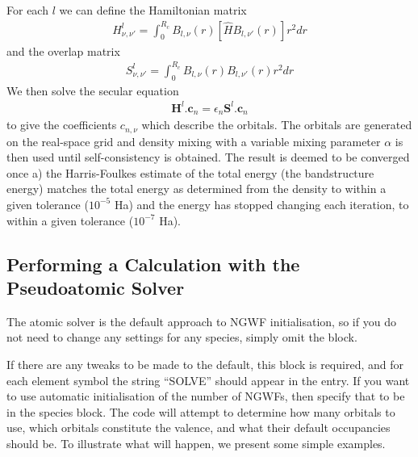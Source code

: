 \documentclass[letterpaper,10pt,english]{sphinxmanual}
\begin{document}
For each \(l\) we can define the Hamiltonian matrix
\begin{equation*}
\begin{split}H_{\nu,\nu'}^{l}=\int_{0}^{R_{c}}B_{l,\nu}(r)\left[\hat{H}B_{l,\nu'}(r)\right]r^{2}dr\end{split}
\end{equation*}
and the overlap matrix
\begin{equation*}
\begin{split}S_{\nu,\nu'}^{l}=\int_{0}^{R_{c}}B_{l,\nu}(r)B_{l,\nu'}(r)r^{2}dr\end{split}
\end{equation*}
We then solve the secular equation
\begin{equation*}
\begin{split}\mathbf{H}^{l}.\mathbf{c}_{n}=\epsilon_{n}\mathbf{S}^{l}.\mathbf{c}_{n}\end{split}
\end{equation*}
to give the coefficients \(c_{n,\nu}\) which describe the orbitals.
The orbitals are generated on the real-space grid and density mixing
with a variable mixing parameter \(\alpha\) is then used until
self-consistency is obtained. The result is deemed to be converged once
a) the Harris-Foulkes estimate of the total energy (the bandstructure
energy) matches the total energy as determined from the density to
within a given tolerance (\(10^{-5}\) Ha) and the energy has stopped
changing each iteration, to within a given tolerance (\(10^{-7}\)
Ha).


\subsection{Performing a Calculation with the Pseudoatomic Solver}
\label{\detokenize{pseudoatomic_solver:performing-a-calculation-with-the-pseudoatomic-solver}}
The atomic solver is the default approach to NGWF initialisation, so if
you do not need to change any settings for any species, simply omit the
 block.

If there are any tweaks to be made to the default, this block is
required, and for each element symbol the string “SOLVE” should appear
in the entry. If you want to use automatic initialisation of the number
of NGWFs, then specify that to be  in the species block. The code
will attempt to determine how many orbitals to use, which orbitals
constitute the valence, and what their default occupancies should be. To
illustrate what will happen, we present some simple examples.
\end{document}
